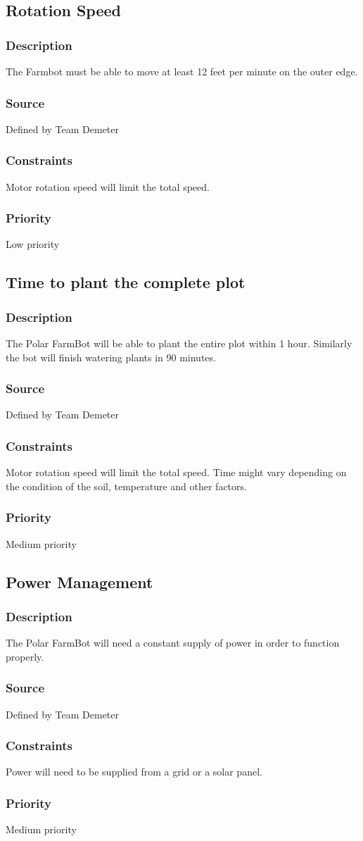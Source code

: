 \subsection{Rotation Speed}
\subsubsection{Description}
The Farmbot must be able to move at least 12 feet per minute on the outer edge. 
\subsubsection{Source}
Defined by Team Demeter
\subsubsection{Constraints}
Motor rotation speed will limit the total speed.
\subsubsection{Priority}
Low priority

\subsection{Time to plant the complete plot}
\subsubsection{Description}
The Polar FarmBot will be able to plant the entire plot within 1 hour. Similarly the bot will finish watering plants in 90 minutes.
\subsubsection{Source}
Defined by Team Demeter
\subsubsection{Constraints}
Motor rotation speed will limit the total speed. Time might vary depending on the condition of the soil, temperature and other factors.
\subsubsection{Priority}
Medium priority

\subsection{Power Management}
\subsubsection{Description}
The Polar FarmBot will need a constant supply of power in order to function properly.
\subsubsection{Source}
Defined by Team Demeter
\subsubsection{Constraints}
Power will need to be supplied from a grid or a solar panel.
\subsubsection{Priority}
Medium priority
